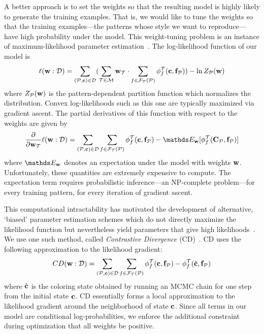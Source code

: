 A better approach is to set the weights so that the resulting model is highly likely to generate the training examples. That is, we would like to tune the weights so that the training examples---the patterns whose style we want to reproduce---have high probability under the model. This weight-tuning problem is an instance of maximum-likelihood parameter estimation~\cite{PGMBook}. The log-likelihood function of our model is
\begin{multline*}
\ell(\mathbf{w} : \mathcal{D}) =
	\sum_{(\mathcal{P}, \mathbf{c}) \in \mathcal{D}}
	(
		\sum_{\mathcal{T} \in \mathcal{M}}
			\mathbf{w}_{\mathcal{T}} \cdot
			\sum_{f \in \mathcal{F}_{\mathcal{T}}(\mathcal{P})}
				\phi^{\mathcal{T}}_f(\mathbf{c}, \mathbf{f}_{\mathcal{P}})
	)			
		- \ln{Z_{\mathcal{P}}(\mathbf{w})}
\end{multline*}
where $Z_{\mathcal{P}}(\mathbf{w})$ is the pattern-dependent partition function which normalizes the distribution. Convex log-likelihoods such as this one are typically maximized via gradient ascent. The partial derivatives of this function with respect to the weights are given by
\begin{multline*}
\frac{\partial}{\partial \weights_\term} \ell(\weights : \dataset) = 
	\sum_{(\pattern, \colors) \in \dataset}
		\sum_{\factor \in \factors(\pattern)}
			\factorStats(\colors, \features_\pattern)
				- \expectation_\weights[\factorStats(\colorVars_\pattern, \features_\pattern)]
\end{multline*}
where $\expectation_\weights$ denotes an expectation under the model with weights $\mathbf{w}$. Unfortunately, these quantities are extremely expensive to compute. The expectation term requires probabilistic inference---an NP-complete problem---for every training pattern, for every iteration of gradient ascent.

This computational intractability has motivated the development of alternative, `biased' parameter estimation schemes which do not directly maximize the likelihood function but nevertheless yield parameters that give high likelihoods~\cite{NonMLEParameterEstimation}. We use one such method, called \emph{Contrastive Divergence} (CD)~\cite{ContrastiveDivergence}. CD uses the following approximation to the likelihood gradient:
\begin{multline*}
CD(\mathbf{w} : \mathcal{D}) = 
	\sum_{(\mathcal{P}, \mathbf{c}) \in \mathcal{D}}
		\sum_{f \in \mathcal{F}_{\mathcal{T}}(\mathcal{P})}
			\phi^{\mathcal{T}}_f(\mathbf{c}, \mathbf{f}_{\mathcal{P}})
		 -\phi^{\mathcal{T}}_f(\hat{\mathbf{c}}, \mathbf{f}_{\mathcal{P}})
\end{multline*}
where $\hat{\mathbf{c}}$ is the coloring state obtained by running an MCMC chain for one step from the initial state $\mathbf{c}$. CD essentially forms a local approximation to the likelihood gradient around the neighborhood of state $\mathbf{c}$. Since all terms in our model are conditional log-probabilities, we enforce the additional constraint during optimization that all weights be positive.~

